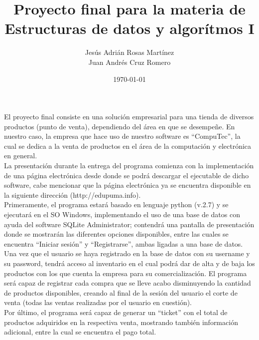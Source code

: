 \documentclass[12pt]{article}
\title{\Large{Proyecto final para la materia de Estructuras de datos y algorítmos I}}
\author{Jes\'us Adri\'an Rosas Mart\'inez\\Juan Andrés Cruz Romero}
\date{\small{\today}}
\begin{document}
\maketitle %
El proyecto final consiste en una solución empresarial para una tienda de diversos productos (punto de venta), dependiendo del área en que se desempeñe. En nuestro caso, la empresa que hace uso de nuestro software es ``CompuTec'', la cual se dedica a la venta de productos en el área de la computación y electrónica en general.\\

La presentación durante la entrega del programa comienza con la implementación de una página electrónica desde donde se podrá descargar el ejecutable de dicho software, cabe mencionar que la página electrónica ya se encuentra disponible en la siguiente dirección (http://edupuma.info).\\

Primeramente, el programa estará basado en lenguaje python (v.2.7) y se ejecutará en el SO Windows, implementando el uso de una base de datos con ayuda del software SQLite Administrator; contendrá una pantalla de presentación donde se mostrarán las diferentes opciones disponibles, entre las cuales se encuentra ``Iniciar sesión'' y ``Registrarse'', ambas ligadas a una base de datos.\\

Una vez que el usuario se haya registrado en la base de datos con su username y su password, tendrá acceso al inventario en el cual podrá dar de alta y de baja los productos con los que cuenta la empresa para su comercialización. El programa será capaz de registrar cada compra que se lleve acabo disminuyendo la cantidad de productos disponibles, creando al final de la sesión del usuario el corte de venta (todas las ventas realizadas por el usuario en cuestión).\\ 

Por último, el programa será capaz de generar un ``ticket'' con el total de productos adquiridos en la respectiva venta, mostrando también información adicional, entre la cual se encuentra el pago total.
\end{document}
